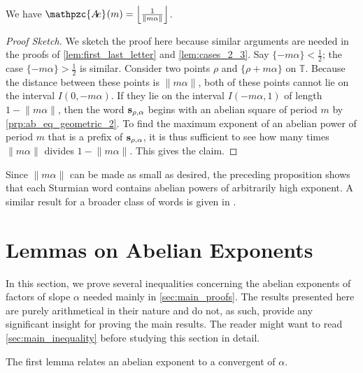 \documentclass[a4paper,fleqn]{article}
\providecommand{\norm}[1]{\lVert#1\rVert}
\providecommand{\Floor}[1]{\left\lfloor#1\right\rfloor}
\newcommand{\infw}[1]{%
  \ifcat\noexpand#1\relax\bm{#1}%
  \else\mathbf{#1}\fi}          %
\newcommand{\abexp}[2][]{\mathpzc{A\mkern-3mu e}_{#1}(#2)}
\newcommand{\T}{\mathbb{T}}
\begin{document}
  \begin{proposition}\label{prp:exp_formula} \cite[Thm.~4.7]{2016:abelian_powers_and_repetitions_in_sturmian_words}
    We have $\abexp{m} = \Floor{\tfrac{1}{\norm{m\alpha}}}$.
  \end{proposition}
  \begin{proof}[Proof Sketch]
    We sketch the proof here because similar arguments are needed in the proofs of \autoref{lem:first_last_letter} and
    \autoref{lem:cases_2_3}. Say $\{-m\alpha\} < \tfrac12$; the case $\{-m\alpha\} > \tfrac12$ is similar. Consider two
    points $\rho$ and $\{\rho + m\alpha\}$ on $\T$. Because the distance between these points is $\norm{m\alpha}$, both
    of these points cannot lie on the interval $I(0, -m\alpha)$. If they lie on the interval $I(-m\alpha, 1)$ of length
    $1 - \norm{m\alpha}$, then the word $\infw{s}_{\rho,\alpha}$ begins with an abelian square of period $m$ by
    \autoref{prp:ab_eq_geometric_2}. To find the maximum exponent of an abelian power of period $m$ that is a prefix of
    $\infw{s}_{\rho,\alpha}$, it is thus sufficient to see how many times $\norm{m\alpha}$ divides
    $1 - \norm{m\alpha}$. This gives the claim.
  \end{proof}

  Since $\norm{m\alpha}$ can be made as small as desired, the preceding proposition shows that each Sturmian word
  contains abelian powers of arbitrarily high exponent. A similar result for a broader class of words is given in
  \cite[Thm.~1.8]{2011:abelian_complexity_of_minimal_subshifts}.

  \section{Lemmas on Abelian Exponents}\label{sec:abelian_exponents}
  In this section, we prove several inequalities concerning the abelian exponents of factors of slope $\alpha$ needed
  mainly in \autoref{sec:main_proofs}. The results presented here are purely arithmetical in their nature and do not,
  as such, provide any significant insight for proving the main results. The reader might want to read
  \autoref{sec:main_inequality} before studying this section in detail.

  The first lemma relates an abelian exponent to a convergent of $\alpha$.
\end{document}
